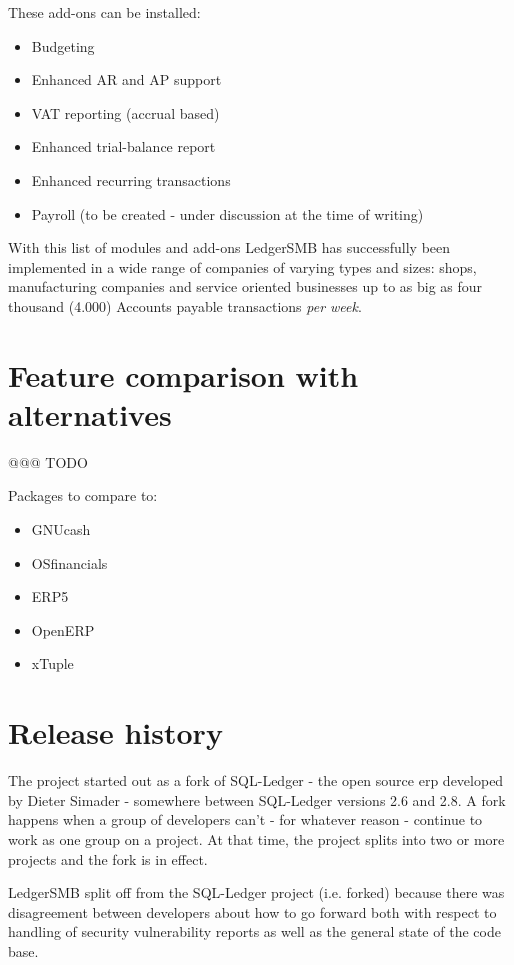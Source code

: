 These \glspl{add-on}  can be installed:
\begin{itemize}
\item Budgeting
\item Enhanced AR and AP support
\item VAT reporting (accrual based)
\item Enhanced trial-balance report
\item Enhanced recurring transactions
\item Payroll (to be created - under discussion at the time of writing)
\end{itemize}

With this list of modules and \glspl{add-on} LedgerSMB has successfully been implemented
in a wide range of companies of varying types and sizes: shops, manufacturing
companies and service oriented businesses up to as big as four thousand (4.000)
Accounts payable transactions \emph{per week}.

\section{Feature comparison with alternatives}
\label{sec-ledgersmb-feature-comparison}
@@@ TODO

Packages to compare to:

\begin{itemize}
\item GNUcash
\item OSfinancials
\item ERP5
\item OpenERP
\item xTuple
\end{itemize}

\section{Release history}
\label{sec-ledgersmb-release-history}

The project started out as a fork of SQL-Ledger - the open source \gls{erp}
developed by Dieter Simader - somewhere between SQL-Ledger versions 2.6
and 2.8.  A fork happens when a group of developers can't - for whatever
reason - continue to work as one group on a project.  At that time, the
project splits into two or more projects and the fork is in effect.

LedgerSMB split off from the SQL-Ledger project (i.e. forked) because
there was disagreement between developers about how to go forward both with
respect to handling of security vulnerability reports as well as the general
state of the code base.

